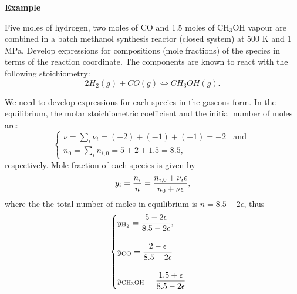    \begin{MyExample}{\begin{center}{\bf Example}\end{center}}
     \begin{example}\label{Chapter:ChemicalReactions:Example1}%
        Five moles of hydrogen, two moles of CO and 1.5 moles of CH$_{3}$OH vapour are combined in a batch methanol synthesis reactor (closed system) at 500 K and 1 MPa. Develop expressions for compositions (\ie mole fractions) of the species in terms of the reaction coordinate. The components are known to react with the following stoichiometry:
  \begin{displaymath}
      2 H_{2} (g) + CO (g) \Longleftrightarrow CH_{3}OH (g).
  \end{displaymath}
     \end{example}

       We need to develop expressions for each species in the gaseous form. In the equilibrium, the molar stoichiometric coefficient and the initial number of moles are:
    \begin{displaymath}
       \begin{cases}
         \nu = \sum\limits_{i}\nu_{i}= (-2)+(-1)+(+1)= -2 \;\;\text{ and } \\
         n_{0} = \sum\limits_{i}n_{i,0}= 5 + 2 + 1.5 = 8.5,
       \end{cases}
    \end{displaymath} 
    respectively. Mole fraction of each species is given by
    \begin{displaymath}
          y_{i} = \displaystyle\frac{n_{i}}{n} = \displaystyle\frac{n_{i,0}+\nu_{i}\epsilon}{n_{0}+\nu\epsilon},
    \end{displaymath}
    where the the total number of moles in equilibrium is $n=8.5-2\epsilon$, thus
    \begin{displaymath}
       \begin{cases}
         y_{\text{H}_{2}} = \displaystyle\frac{5-2\epsilon}{8.5-2\epsilon}, \\
         \\
         y_{\text{CO}} = \displaystyle\frac{2-\epsilon}{8.5-2\epsilon}\\
         \\
          y_{\text{CH}_{3}\text{OH}}=\displaystyle\frac{1.5+\epsilon}{8.5-2\epsilon}
       \end{cases}
    \end{displaymath}
    
   \end{MyExample} 

